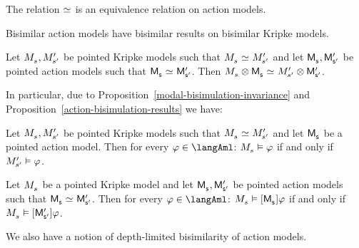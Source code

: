 \begin{proposition}
The relation $\bisimilar$ is an equivalence relation on action models.
\end{proposition}

Bisimilar action models have bisimilar results on bisimilar Kripke models.

\begin{proposition}\label{action-bisimulation-results}
Let $\kPModel{\kStateS}, \kPModelP{\kStateSP}$ be pointed Kripke models such that $\kPModel{\kStateS} \bisimilar \kPModelP{\kStateSP}$ and
let $\aPModel{\aStateS}, \aPModelP{\aStateSP}$ be pointed action models such that $\aPModel{\aStateS} \bisimilar \aPModelP{\aStateSP}$.
Then $\kPModel{\kStateS} \exec \aPModel{\aStateS} \bisimilar \kPModelP{\kStateSP} \exec \aPModelP{\aStateSP}$.
\end{proposition}

In particular, due to Proposition~\ref{modal-bisimulation-invariance} and Proposition~\ref{action-bisimulation-results} we have:

\begin{proposition}
Let $\kPModel{\kStateS}, \kPModelP{\kStateSP}$ be pointed Kripke models such that $\kPModel{\kStateS} \bisimilar \kPModelP{\kStateSP}$ and
let $\aPModel{\aStateS}$ be a pointed action model.
Then for every $\phi \in \langAml$: $\kPModel{\kStateS} \entails \phi$ if and only if ${M^{\prime}_{{{s}^{\prime}}}} \vDash \varphi$.
\end{proposition}

\begin{proposition}
Let $\kPModel{\kStateS}$ be a pointed Kripke model and
let $\aPModel{\aStateS}, \aPModelP{\aStateSP}$ be pointed action models such that $\aPModel{\aStateS} \bisimilar \aPModelP{\aStateSP}$.
Then for every $\phi \in \langAml$: $\kPModel{\kStateS} \entails \actionA{\aPModel{\aStateS}} \phi$ if and only if $\kPModel{\kStateS} \entails \actionA{\aPModelP{\aStateSP}} \phi$.
\end{proposition}

We also have a notion of depth-limited bisimilarity of action models.


